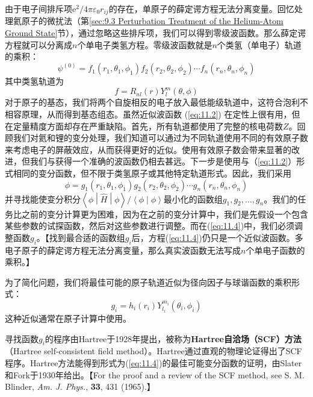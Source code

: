     由于电子间排斥项$\mathrm{e}^2 / 4\pi\varepsilon_0r_{ij}$的存在，单原子的薛定谔方程无法分离变量。回忆处理氦原子的微扰法（第\ref{sec:9.3 Perturbation Treatment of the Helium-Atom Ground State}节），通过忽略这些排斥项，我们可以得到零级波函数。那么薛定谔方程就可以分离成$n$个单电子类氢方程。零级波函数就是$n$个类氢（单电子）轨道的乘积：
    \begin{equation}
        \psi^{(0)} = f_1(r_1, \theta_1, \phi_1) f_2(r_2, \theta_2, \phi_2) \cdots f_n(r_n, \theta_n, \phi_n)
        \label{eq:11.2}
    \end{equation}
    其中类氢轨道为
    \begin{equation}
        f = R_{nl}(r) Y_{l}^m(\theta, \phi)
        \label{eq:11.3}
    \end{equation}
    对于原子的基态，我们将两个自旋相反的电子放入最低能级轨道中，这符合泡利不相容原理，从而得到基态组态。虽然近似波函数 (\ref{eq:11.2}) 在定性上很有用，但在定量精度方面却存在严重缺陷。首先，所有轨道都使用了完整的核电荷数$Z$。回顾我们对氦和锂的变分处理，我们知道可以通过为不同轨道使用不同的有效原子数来考虑电子的屏蔽效应，从而获得更好的近似。使用有效原子数会带来显著的改进，但我们与获得一个准确的波函数仍相去甚远。下一步是使用与（\ref{eq:11.2}）形式相同的变分函数，但不限于类氢原子或其他特定轨道形式。因此，我们采用
    \begin{equation}
        \phi = g_1\left(r_1, \theta_1, \phi_1\right) g_2\left(r_2, \theta_2, \phi_2\right) \cdots g_n\left(r_n, \theta_n, \phi_n\right)
        \label{eq:11.4}
    \end{equation}
    并寻找能使变分积分$\left\langle \phi \middle| \hat{H} \middle| \phi \right\rangle \big/ \left\langle \phi \middle| \phi \right\rangle$最小化的函数组$g_1, g_2, \ldots, g_n$。我们的任务比之前的变分计算更为困难，因为在之前的变分计算中，我们是先假设一个包含某些参数的试探函数，然后对这些参数进行调整。而在(\ref{eq:11.4})中，我们必须调整函数$g_i$。【找到最合适的函数组$g_i$后，方程(\ref{eq:11.4})仍只是一个近似波函数。多电子原子的薛定谔方程无法分离变量，那么真实波函数无法写成$n$个单电子函数的乘积。】

    为了简化问题，我们将最佳可能的原子轨道近似为径向因子与球谐函数的乘积形式：
    \begin{equation}
        g_i = h_i(r_i) Y_{l_i}^{m_i}(\theta_i, \phi_i)
        \label{eq:11.5}
    \end{equation}
    这种近似通常在原子计算中使用。

    寻找函数$g_i$的程序由Hartree于1928年提出，被称为\textbf{Hartree自洽场（SCF）方法}（Hartree self-consistent field method）。Hartree通过直观的物理论证得出了SCF程序。Hartree方法能得到形式为(\ref{eq:11.4})的最佳可能变分函数的证明，由Slater和Fork于1930年给出。【For the proof and a review of the SCF method, see S. M. Blinder, \textit{Am. J. Phys.}, \textbf{33}, 431 (1965).】

